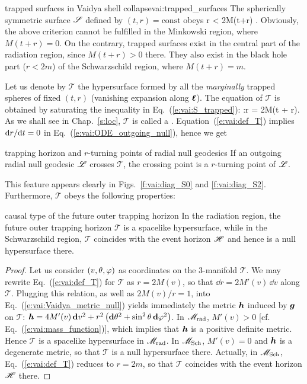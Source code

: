 \begin{tprop}{trapped surfaces in Vaidya shell collapse}{vai:trapped_surfaces}
The spherically symmetric surface $\mathscr{S}$ defined by $(t,r) = \mathrm{const}$ obeys
\be \label{e:vai:S_trapped}
    \Sp {} \iff r < 2M(t+r) .
\ee
Obviously, the above criterion cannot be fulfilled in the Minkowski region, where $M(t+r) = 0$.
On the contrary, trapped surfaces exist
in the central part of the radiation region, since $M(t+r) > 0$ there.
They also exist in the black hole part ($r < 2m$)
of the Schwarzschild region, where
$M(t+r) = m$.
\end{tprop}

Let us denote by $\mathscr{T}$ the hypersurface formed by
all the \emph{marginally} trapped spheres
of fixed $(t,r)$ (vanishing expansion along $\bm{\ell}$). The equation
of $\mathscr{T}$ is obtained by saturating the inequality
in Eq.~(\ref{e:vai:S_trapped}):
\be \label{e:vai:def_T}
    :\qquad r = 2M(t + r).
\ee
As we shall see in
Chap.~\ref{s:loc}, $\mathscr{T}$ is called a
.
Equation~(\ref{e:vai:def_T}) implies $\mathrm{d} r / \mathrm{d} t = 0$ in Eq.~(\ref{e:vai:ODE_outgoing_null}),
hence we get
\begin{tprop}{trapping horizon and $r$-turning points of radial null geodesics}{}
If an outgoing radial null geodesic $\mathscr{L}$ crosses $\mathscr{T}$,
the crossing point is a $r$-turning point of $\mathscr{L}$.
\end{tprop}
This feature appears clearly in Figs.~\ref{f:vai:diag_S0} and \ref{f:vai:diag_S2}.
Furthermore, $\mathscr{T}$ obeys the following properties:
\begin{tprop}{causal type of the future outer trapping horizon}{}
In the radiation region, the future outer trapping horizon $\mathscr{T}$ is a
spacelike hypersurface, while in the Schwarzschild region, $\mathscr{T}$
coincides with the event horizon $\mathscr{H}$ and hence is a null hypersurface there.
\end{tprop}

\begin{proof}
Let us consider $(v,\theta,\varphi)$ as coordinates on the 3-manifold $\mathscr{T}$.
We may rewrite Eq.~(\ref{e:vai:def_T}) for $\mathscr{T}$ as $r = 2M(v)$, so that
$\dd r = 2M'(v) \, \dd v$ along $\mathscr{T}$.
Plugging this relation, as well as $2M(v)/r=1$, into Eq.~(\ref{e:vai:Vaidya_metric_null})
yields immediately the metric $\bm{h}$ induced by $\bm{g}$ on $\mathscr{T}$:
$\bm{h} = 4 M'(v) \, \mathbf{d} v^2
        + r^2 \left( \mathbf{d}\theta^2 + \sin^2\theta\, \mathbf{d}\varphi^2 \right)$.
In $\mathscr{M}_{\rm rad}$, $M'(v) > 0$ [cf. Eq.~(\ref{e:vai:mass_function})], which
implies that $\bm{h}$ is a positive definite metric. Hence $\mathscr{T}$
is a spacelike hypersurface in $\mathscr{M}_{\rm rad}$. In $\mathscr{M}_{\rm Sch}$, $M'(v) = 0$ and $\bm{h}$
is a degenerate metric, so that $\mathscr{T}$ is a null hypersurface there.
Actually, in $\mathscr{M}_{\rm Sch}$, Eq.~(\ref{e:vai:def_T}) reduces
to $r = 2m$, so that $\mathscr{T}$ coincides with the event horizon $\mathscr{H}$ there.
\end{proof}

